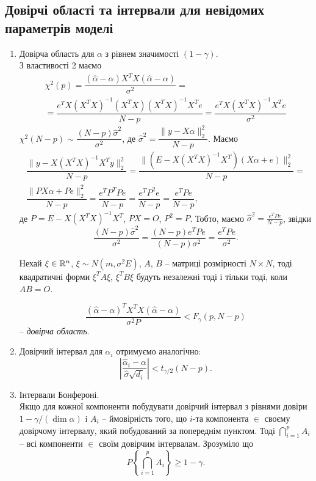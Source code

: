 \subsection{Довірчі області та інтервали для невідомих параметрів моделі}
\begin{enumerate}
	\item Довірча область для $\alpha$ з рівнем значимості $(1-\gamma)$. \\

	З властивості 2 маємо 
	\begin{multline*}
		\chi^2(p) = \dfrac{(\widehat{\alpha}-\alpha)X^TX(\widehat{\alpha}-\alpha)}{\sigma^2} = \\
		= \dfrac{e^TX(X^TX)^{-1}(X^TX)(X^TX)^{-1}X^Te}{N-p} = \dfrac{e^TX(X^TX)^{-1}X^Te}{\sigma^2}
	\end{multline*}
	$\chi^2(N - p)\sim \dfrac{(N-p)\widehat{\sigma}^2}{\sigma^2}$, де $\widehat{\sigma}^2 = \dfrac{\|y-X\alpha\|_2^2}{N-p}$. Маємо
	\begin{multline*} 
		\dfrac{\|y-X(X^TX)^{-1}X^Ty\|_2^2}{N-p} = \dfrac{\|(E-X(X^TX)^{-1}X^T)(X\alpha+e)\|_2^2}{N-p} = \\
		\dfrac{\|PX\alpha+Pe\|_2^2}{N-p} = \dfrac{e^TP^TPe}{N-p} = \dfrac{e^TP^2e}{N-p} = \dfrac{e^TPe}{N-p},
	\end{multline*}
	де $P = E-X(X^TX)^{-1}X^T$, $PX=O$, $P^2=P$. Тобто, маємо $\widehat{\sigma}^2 = \frac{e^TPe}{N-p}$, звідки \[\dfrac{(N-p)\widehat{\sigma}^2}{\sigma^2}=\dfrac{(N-p)e^TPe}{(N-p)\sigma^2} = \dfrac{e^TPe}{\sigma^2}. \]
	\begin{lemma}	
		Нехай $\xi\in\mathbb{R}^n$, $\xi\sim N(m,\sigma^2E)$, $A$, $B$ -- матриці розмірності $N\times N$, тоді квадратичні форми $\xi^TA\xi$, $\xi^TB\xi$ будуть незалежні тоді і тільки тоді, коли $AB = O$.
	\end{lemma}
	\[ \dfrac{(\widehat{\alpha}-\alpha)^TX^TX(\widehat{\alpha}-\alpha)}{\sigma^2P} < F_\gamma(p, N-p)\] -- \textit{довірча область}.
	\item Довірчий інтервал для $\alpha_i$ отримуємо аналогічно:
	\[ \left|\dfrac{\widehat{\alpha}_i-\alpha}{\widehat{\sigma}\sqrt{d_i}}\right|<t_{\gamma/2}(N-p). \]
	\item Інтервали Бонфероні. \\

	Якщо для кожної компоненти побудувати довірчий інтервал з рівнями довіри $1 - \gamma/(\dim \alpha)$ i $A_i$ -- ймовірність того, що $i$-та компонента $\in$ своєму довірчому інтервалу, який побудований за попереднім пунктом. Тоді $\bigcap\limits_{i=1}^p A_i$ -- всі компоненти $\in$ своїм довірчим інтервалам. Зрозуміло що \[P\left\{\bigcap\limits_{i=1}^p A_i\right\}\ge1-\gamma.\]
\end{enumerate}
